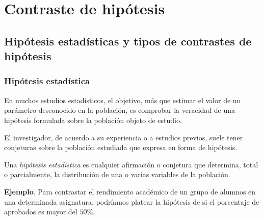 \section{Contraste de hipótesis}



\subsection{Hipótesis estadísticas y tipos de contrastes de hipótesis}
\begin{frame}
\frametitle{Hipótesis estadística}
En muchos estudios estadísticos, el objetivo, más que estimar el valor de un parámetro desconocido en la población, es
comprobar la veracidad de una hipótesis formulada sobre la población objeto de estudio.

El investigador, de acuerdo a su experiencia o a estudios previos, suele tener conjeturas sobre la población estudiada
que expresa en forma de hipótesis. 

\begin{definicion}
Una \emph{hipótesis estadística} es cualquier afirmación o conjetura que determina, total o parcialmente, la
distribución de una o varias variables de la población. 
\end{definicion}

\textbf{Ejemplo}. Para contrastar el rendimiento académico de un grupo de alumnos en una determinada asignatura,
podríamos platear la hipótesis de si el porcentaje de aprobados es mayor del $50\%$. 
\end{frame}


